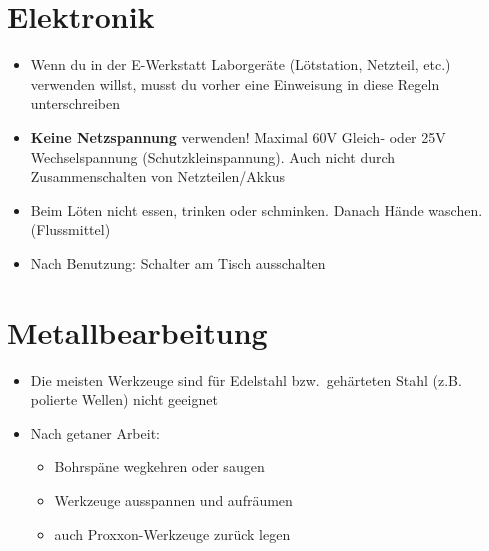 \documentclass[13pt]{\basedir/fablab-document}
\begin{document}
\vbox{\vspace{0,5cm}}

\section{Elektronik}
\begin{itemize}
  \item Wenn du in der E-Werkstatt Laborgeräte (Lötstation, Netzteil, etc.) verwenden willst, musst du vorher eine Einweisung in diese Regeln unterschreiben
  \item \textbf{Keine Netzspannung} verwenden! Maximal 60V Gleich- oder 25V Wechselspannung (Schutzkleinspannung). Auch nicht durch Zusammenschalten von Netzteilen/Akkus

 \item Beim Löten nicht essen, trinken oder schminken. Danach Hände waschen. (Flussmittel)
 \item Nach Benutzung: Schalter am Tisch ausschalten
\end{itemize}


\section{Metallbearbeitung}
\begin{itemize}
	\item Die meisten Werkzeuge sind für Edelstahl bzw.\  gehärteten Stahl (z.B. polierte Wellen) nicht geeignet
	\item Nach getaner Arbeit:
	\begin{itemize}
		\item Bohrspäne wegkehren oder saugen
		\item Werkzeuge ausspannen und aufräumen
		\item auch Proxxon-Werkzeuge zurück legen
	\end{itemize}
\end{itemize}


\vbox{\vspace{0,5cm}}
\end{document}
